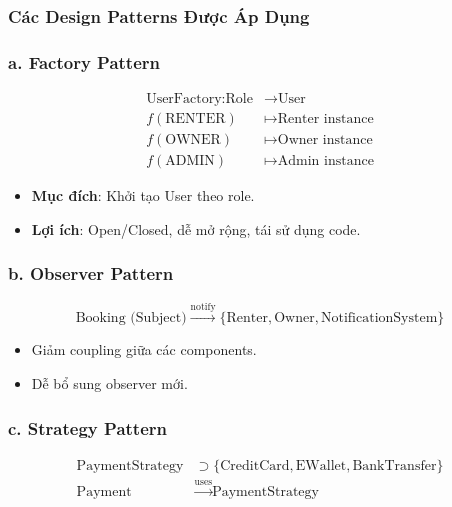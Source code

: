 \subsubsection{Các Design Patterns Được Áp Dụng}

\subsubsection*{a. Factory Pattern}

\begin{align*}
\text{UserFactory}: \text{Role} &\rightarrow \text{User} \\
f(\text{RENTER}) &\mapsto \text{Renter instance} \\
f(\text{OWNER}) &\mapsto \text{Owner instance} \\
f(\text{ADMIN}) &\mapsto \text{Admin instance}
\end{align*}

\begin{itemize}
    \item \textbf{Mục đích}: Khởi tạo User theo role.
    \item \textbf{Lợi ích}: Open/Closed, dễ mở rộng, tái sử dụng code.
\end{itemize}

\subsubsection*{b. Observer Pattern}

\begin{equation*}
\text{Booking (Subject)} \xrightarrow{\text{notify}} 
\{\text{Renter}, \text{Owner}, \text{NotificationSystem}\}
\end{equation*}

\begin{itemize}
    \item Giảm coupling giữa các components.
    \item Dễ bổ sung observer mới.
\end{itemize}

\subsubsection*{c. Strategy Pattern}

\begin{align*}
\text{PaymentStrategy} &\supset \{\text{CreditCard}, \text{EWallet}, \text{BankTransfer}\} \\
\text{Payment} &\xrightarrow{\text{uses}} \text{PaymentStrategy}
\end{align*}

